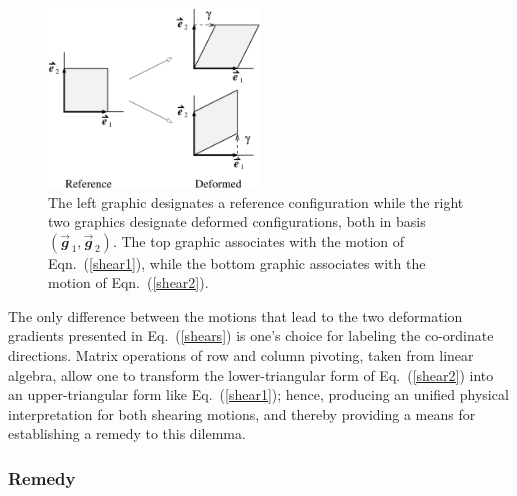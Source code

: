 \begin{figure}
	\centering
	\includegraphics[width=0.5\textwidth]{figures/figDilemma.pdf}
	\caption{The left graphic designates a reference configuration while the right two graphics designate deformed configurations, both in basis $( \vec{\mathbfit{g}}_{\,1} , \vec{\mathbfit{g}}_{\,2})$.  The top graphic associates with the motion of Eqn.~(\ref{shear1}), while the bottom graphic associates with the motion of Eqn.~(\ref{shear2}).}
	\label{figDilemma}
\end{figure}

The only difference between the motions that lead to the two deformation gradients presented in Eq.~(\ref{shears}) is one's choice for labeling the co-ordinate directions.  Matrix operations of row and column pivoting, taken from linear algebra, allow one to transform the lower-triangular form of Eq.~(\ref{shear2}) into an upper-triangular form like Eq.~(\ref{shear1}); hence, producing an unified physical interpretation for both shearing motions, and thereby providing a means for establishing a remedy to this dilemma. 


\subsubsection{Remedy}
\label{secRemedy}

